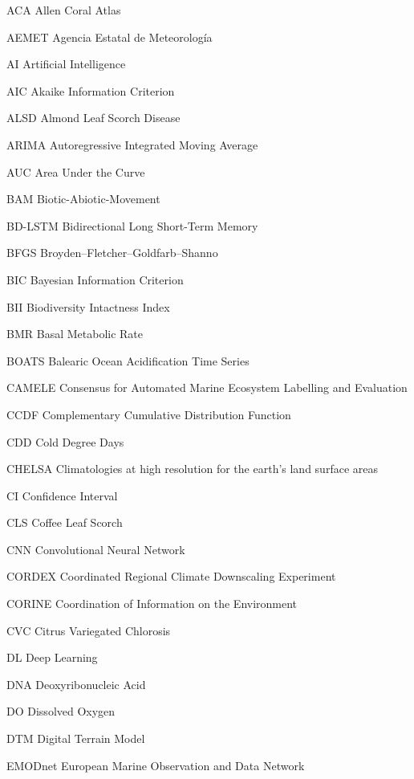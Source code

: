\begin{abbreviations}
    \item[ACA] Allen Coral Atlas
    \item[AEMET] Agencia Estatal de Meteorología
    \item[AI] Artificial Intelligence
    \item[AIC] Akaike Information Criterion
    \item[ALSD] Almond Leaf Scorch Disease
    \item[ARIMA] Autoregressive Integrated Moving Average
    \item[AUC] Area Under the Curve
    \item[BAM] Biotic-Abiotic-Movement
    \item[BD-LSTM] Bidirectional Long Short-Term Memory
    \item[BFGS] Broyden–Fletcher–Goldfarb–Shanno
    \item[BIC] Bayesian Information Criterion
    \item[BII] Biodiversity Intactness Index
    \item[BMR] Basal Metabolic Rate
    \item[BOATS] Balearic Ocean Acidification Time Series
    \item[CAMELE] Consensus for Automated Marine Ecosystem Labelling and
    Evaluation
    \item[CCDF] Complementary Cumulative Distribution Function
    \item[CDD] Cold Degree Days
    \item[CHELSA] Climatologies at high resolution for the earth’s land surface
    areas
    \item[CI] Confidence Interval
    \item[CLS] Coffee Leaf Scorch
    \item[CNN] Convolutional Neural Network
    \item[CORDEX] Coordinated Regional Climate Downscaling Experiment
    \item[CORINE] Coordination of Information on the Environment
    \item[CVC] Citrus Variegated Chlorosis
    \item[DL] Deep Learning
    \item[DNA] Deoxyribonucleic Acid
    \item[DO] Dissolved Oxygen
    \item[DTM] Digital Terrain Model
    \item[EMODnet] European Marine Observation and Data Network

\end{abbreviations}

